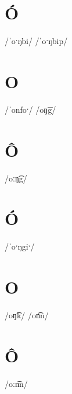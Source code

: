\documentclass[10pt,a4paper,twoside]{book}
\begin{document}
\section*{Ó}

\begin{multicols}{3}
 {/ˈoˑŋbi/} {}
 {/ˈoˑŋbip/} {}
\end{multicols}

\section*{O}

\begin{multicols}{3}
 {/ˈonfoˑ/} {}
 {/oŋ͡g/} {}
\end{multicols}

\section*{Ô}

\begin{multicols}{3}
 {/oːŋ͡g/} {}
\end{multicols}

\section*{Ó}

\begin{multicols}{3}
 {/ˈoˑŋgiˑ/} {}
\end{multicols}

\section*{O}

\begin{multicols}{3}
 {/oŋ͡k/} {}
 {/on͡n/} {}
\end{multicols}

\section*{Ô}

\begin{multicols}{3}
 {/oːn͡n/} {}
\end{multicols}
\end{document}
